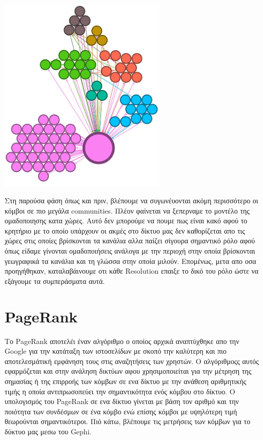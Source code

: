 \documentclass[12pt]{article}
\begin{document}
	\vspace{12pt}
	\begin{center}
		\includegraphics[width=0.6\textwidth]{photos-files/section12/0.96/no_label_layout.JPG}
	\end{center}
	
	Στη παρούσα φάση όπως και πριν, βλέπουμε να συγωνέυονται ακόμη περισσότερο οι κόμβοι σε πιο μεγάλα communities. Πλέον φαίνεται να ξεπερναμε το μοντέλο της ομαδοποιησης κατα χώρες. Αυτό δεν μπορούμε να πουμε πως είναι κακό αφού το κρητήριο με το οποίο υπάρχουν οι ακμές στο δίκτυο μας δεν καθορίζεται απο τις χώρες στις οποίες βρίσκονται τα κανάλια αλλα παίζει σίγουρα σημαντικό ρόλο αφού όπως είδαμε γίνονται ομαδοποιήσεις ανάλογα με την περιοχή στην οποία βρίσκονται γεωγραφικά τα κανάλια και τη γλώσσα στην οποία μιλούν. Επομένως, μετα απο οσα προηγήθηκαν, καταλαβάινουμε οτι κάθε Resolution επαιξε το δικό του ρόλο ώστε να εξάγουμε τα συμπεράσματα αυτά.
	\label{chap:community_structure_(modularity)_12}
	
	
	\newpage
	\section{PageRank}
	\label{chap:PageRank_13}
	Το PageRank αποτελέι έναν αλγόριθμο ο οποίος αρχικά αναπτύχθηκε απο την Google για την κατάταξη των ιστοσελίδων με σκοπό την καλύτερη και πιο αποτελεσμάτική εμφάνηση τους στις αναζητήσεις των χρηστών. Ο αλγόριθμοςς αυτός εφαρμόζεται και στην ανάληση δικτύων  αφου χρησιμοποιείται για την μέτρηση της σημασίας ή της επιρροής των κόμβων σε ενα δίκτυο με την ανάθεση αριθμητικής τιμής η οποία αντιπρωσοπεύει την σημαντικότητα ενός κόμβου στο δίκτυο. Ο υπολογισμός του PageRank σε ενα δίκτυο γίνεται με βάση τον αριθμό και την ποιότητα των συνδέσμων σε ένα κόμβο ενώ επίσης κόμβοι με υψηλότερη τιμή θεωρούνται σημαντικότεροι. Πιό κάτω, βλέπουμε τις μετρήσεις των κόμβων για το δύκτυο μας μεσω του Gephi.
	
\end{document}
